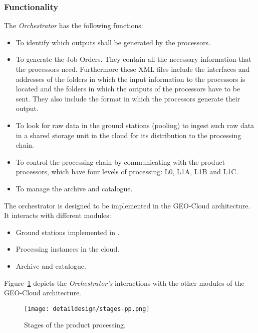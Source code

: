 \subsubsection{Functionality}

The \emph{Orchestrator} has the following functions:

\begin{itemize}
\item To identify which outputs shall be generated by the processors.
\item To generate the Job Orders. They contain all the necessary information
  that the processors need. Furthermore these \ac{XML} files include the interfaces and addresses of the folders in which the input information to the processors is located and the folders in which the outputs of the processors have to be sent. They also include the format in which the processors generate their output.
\item To look for raw data in the ground stations (pooling) to ingest such raw data in a shared storage unit in the cloud for its distribution to the processing chain.
\item To control the processing chain by communicating with the product processors, which have four levels of processing: L0, L1A, L1B and L1C.
\item To manage the archive and catalogue.
\end{itemize}

The orchestrator is designed to be implemented in the GEO-Cloud architecture. It
interacts with different modules:
\begin{itemize}

\item Ground stations implemented in \vw.
\item Processing instances in the cloud.
\item Archive and catalogue.
\end{itemize}

Figure~\ref{fig:orchestrator-interactions} depicts the \emph{Orchestrator’s} interactions with the other modules of the GEO-Cloud architecture.


\begin{figure}[!h]
\begin{center}
\texttt{[image: detaildesign/stages-pp.png]}
\caption{Stages of the product processing.}
\label{fig:orchestrator-interactions}
\end{center}
\end{figure}


